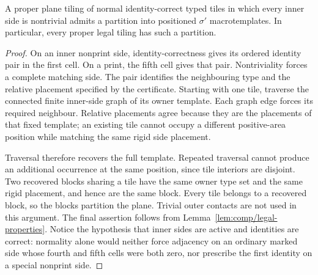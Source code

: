 \begin{lemma}
\label{lem:comp/assembly}
A proper plane tiling of normal identity-correct typed tiles in which every
inner side is nontrivial admits a partition into positioned $\sigma'$ macrotemplates.
In particular, every proper legal tiling has such a partition.
\end{lemma}
\begin{proof}
On an inner nonprint side, identity-correctness gives its ordered identity
pair in the first cell. On a print, the fifth cell gives that pair.
Nontriviality forces a complete matching side. The pair identifies the
neighbouring type and the relative placement specified by the certificate.
Starting with one tile, traverse the connected finite inner-side graph of
its owner template. Each graph edge forces its required neighbour. Relative
placements agree because they are the placements of that fixed template;
an existing tile cannot occupy a different positive-area position while
matching the same rigid side placement.

Traversal therefore recovers the full template. Repeated traversal cannot
produce an additional occurrence at the same position, since tile interiors
are disjoint. Two recovered blocks sharing a tile have the same owner type
set and the same rigid placement, and hence are the same block. Every tile
belongs to a recovered block, so the blocks partition the plane. Trivial
outer contacts are not used in this argument. The final assertion follows
from Lemma~\ref{lem:comp/legal-properties}. Notice the hypothesis that inner
sides are active and identities are correct: normality alone would neither
force adjacency on an ordinary marked side whose fourth and fifth cells
were both zero, nor prescribe the first identity on a special nonprint side.
\end{proof}

